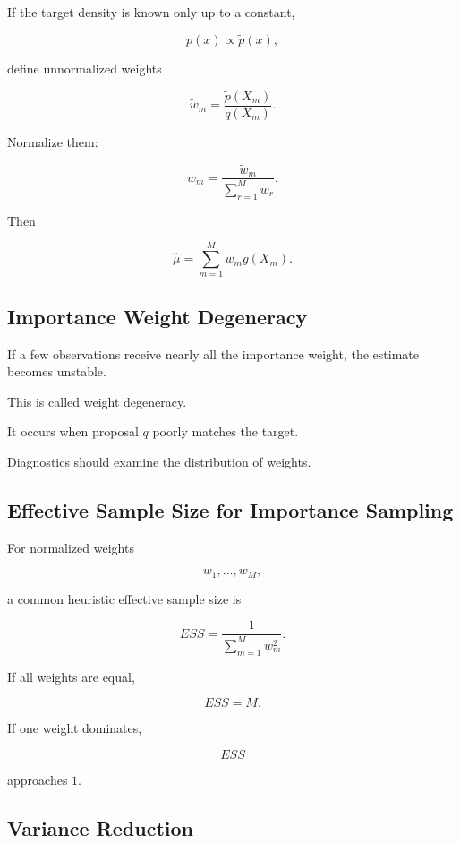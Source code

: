 If the target density is known only up to a constant,

\[
p(x)
\propto
\widetilde{p}(x),
\]

define unnormalized weights

\[
\widetilde{w}_m
=
\frac{
\widetilde{p}(X_m)
}{
q(X_m)
}.
\]

Normalize them:

\[
\boxed{
w_m
=
\frac{
\widetilde{w}_m
}{
\sum_{r=1}^{M}
\widetilde{w}_r
}.
}
\]

Then

\[
\boxed{
\widehat{\mu}
=
\sum_{m=1}^{M}
w_m
g(X_m).
}
\]

\subsection{Importance Weight Degeneracy}
\label{subsec:importance-weight-degeneracy}

If a few observations receive nearly all the importance weight, the
estimate becomes unstable.

This is called weight degeneracy.

It occurs when proposal \(q\) poorly matches the target.

Diagnostics should examine the distribution of weights.

\subsection{Effective Sample Size for Importance Sampling}
\label{subsec:importance-sampling-ess}

For normalized weights

\[
w_1,\ldots,w_M,
\]

a common heuristic effective sample size is

\[
\boxed{
ESS
=
\frac1{
\sum_{m=1}^{M}
w_m^2
}.
}
\]

If all weights are equal,

\[
ESS=M.
\]

If one weight dominates,

\[
ESS
\]

approaches \(1\).

\subsection{Variance Reduction}
\label{subsec:monte-carlo-variance-reduction}

